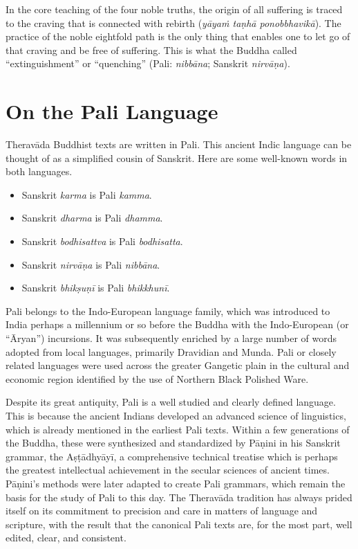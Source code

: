 \documentclass[12pt,openany]{book}%
\begin{document}
In the core teaching of the four noble truths, the origin of all suffering is traced to the craving that is connected with rebirth (\textit{\textsanskrit{yāyaṁ} \textsanskrit{taṇhā} \textsanskrit{ponobbhavikā}}). The practice of the noble eightfold path is the only thing that enables one to let go of that craving and be free of suffering. This is what the Buddha called “extinguishment” or “quenching” (Pali: \textit{\textsanskrit{nibbāna}}; Sanskrit \textit{\textsanskrit{nirvāṇa}}).

\section*{On the Pali Language}

\textsanskrit{Theravāda} Buddhist texts are written in Pali. This ancient Indic language can be thought of as a simplified cousin of Sanskrit. Here are some well-known words in both languages.

\begin{itemize}%
\item Sanskrit \textit{karma} is Pali \textit{kamma}.%
\item Sanskrit \textit{dharma} is Pali \textit{dhamma}.%
\item Sanskrit \textit{bodhisattva} is Pali \textit{bodhisatta}.%
\item Sanskrit \textit{\textsanskrit{nirvāṇa}} is Pali \textit{\textsanskrit{nibbāna}}.%
\item Sanskrit \textit{\textsanskrit{bhikṣuṇī}} is Pali \textit{\textsanskrit{bhikkhunī}}.%
\end{itemize}

Pali belongs to the Indo-European language family, which was introduced to India perhaps a millennium or so before the Buddha with the Indo-European (or “Āryan”) incursions. It was subsequently enriched by a large number of words adopted from local languages, primarily Dravidian and Munda. Pali or closely related languages were used across the greater Gangetic plain in the cultural and economic region identified by the use of Northern Black Polished Ware. 

Despite its great antiquity, Pali is a well studied and clearly defined language. This is because the ancient Indians developed an advanced science of linguistics, which is already mentioned in the earliest Pali texts. Within a few generations of the Buddha, these were synthesized and standardized by \textsanskrit{Pāṇini} in his Sanskrit grammar, the \textsanskrit{Aṣṭādhyāyī}, a comprehensive technical treatise which is perhaps the greatest intellectual achievement in the secular sciences of ancient times. \textsanskrit{Pāṇini}’s methods were later adapted to create Pali grammars, which remain the basis for the study of Pali to this day. The \textsanskrit{Theravāda} tradition has always prided itself on its commitment to precision and care in matters of language and scripture, with the result that the canonical Pali texts are, for the most part, well edited, clear, and consistent.
\end{document}
